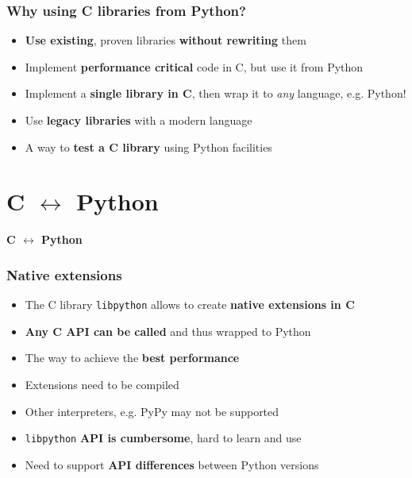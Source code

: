 \documentclass{beamer}
\begin{document}
\begin{frame}
  \frametitle{Why using C libraries from Python?}

  \begin{itemize}
    \item<1-> \textbf{Use existing}, proven libraries \textbf{without rewriting}
      them
    \item<2-> Implement \textbf{performance critical} code in C, but use it from
      Python
    \item<3-> Implement a \textbf{single library in C}, then wrap it to
      \textit{any} language, e.g. Python!
    \item<4-> Use \textbf{legacy libraries} with a modern language
    \item<5-> A way to \textbf{test a C library} using Python facilities
  \end{itemize}
\end{frame}

\section{C $\leftrightarrow$ Python}

\begin{frame}[plain]{}
  \begin{center}
    \Huge \textbf{C $\leftrightarrow$ Python}
  \end{center}
\end{frame}

\begin{frame}
  \frametitle{Native extensions}

  \begin{itemize}
    \item<1-> The C library \texttt{libpython} allows to create \textbf{native
      extensions in C}
    \item<2-> \textbf{Any C API can be called} and thus wrapped to Python
    \item<3-> The way to achieve the \textbf{best performance}
  \end{itemize}


  \begin{itemize}
    \item<5-> Extensions need to be compiled
    \item<6-> Other interpreters, e.g. PyPy may not be supported
    \item<7-> \texttt{libpython} \textbf{API is cumbersome}, hard to learn and
      use
    \item<8-> Need to support \textbf{API differences} between Python versions
  \end{itemize}
\end{frame}
\end{document}
